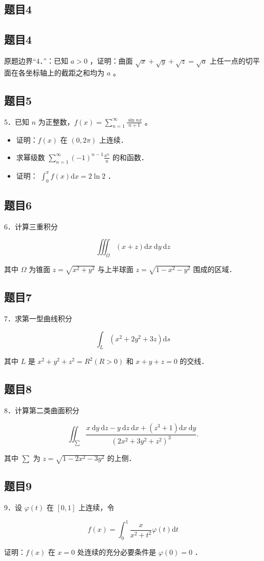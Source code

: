 \documentclass{article}
\begin{document}
\subsection{题目4}

\subsection{题目4}
原题边界“4．”：已知 \(a>0\) ，证明：曲面 \(\sqrt{x}+\sqrt{y}+\sqrt{z}=\sqrt{a}\) 上任一点的切平面在各坐标轴上的截距之和均为 \(a\) 。

\subsection{题目5}
5．已知 \(n\) 为正整数，\(f(x)=\sum_{n=1}^{\infty} \frac{\sin n x}{n+1}\) 。

\begin{itemize}
  \item[（1）] 证明：\(f(x)\) 在 \((0,2 \pi)\) 上连续．
  \item[（2）] 求幂级数 \(\sum_{n=1}^{\infty}(-1)^{n-1} \frac{x^{n}}{n}\) 的和函数．
  \item[（3）] 证明： \(\int_{0}^{\pi} f(x) \mathrm{d} x=2 \ln 2\) ．
\end{itemize}

\subsection{题目6}
6．计算三重积分

\[
\iiint_{\Omega}(x+z) \mathrm{d} x \mathrm{~d} y \mathrm{~d} z
\]

其中 \(\Omega\) 为锥面 \(z=\sqrt{x^{2}+y^{2}}\) 与上半球面 \(z=\sqrt{1-x^{2}-y^{2}}\) 围成的区域．

\subsection{题目7}
7．求第一型曲线积分

\[
\int_{L}\left(x^{2}+2 y^{2}+3 z\right) \mathrm{d} s
\]

其中 \(L\) 是 \(x^{2}+y^{2}+z^{2}=R^{2}(R>0)\) 和 \(x+y+z=0\) 的交线．

\subsection{题目8}
8．计算第二类曲面积分

\[
\iint_{\sum} \frac{x \mathrm{~d} y \mathrm{~d} z-y \mathrm{~d} z \mathrm{~d} x+\left(z^{3}+1\right) \mathrm{d} x \mathrm{~d} y}{\left(2 x^{2}+3 y^{2}+z^{2}\right)^{3}} .
\]

其中 \(\sum\) 为 \(z=\sqrt{1-2 x^{2}-3 y^{2}}\) 的上侧．

\subsection{题目9}
9．设 \(\varphi(t)\) 在 \([0,1]\) 上连续，令

\[
f(x)=\int_{0}^{1} \frac{x}{x^{2}+t^{2}} \varphi(t) \mathrm{d} t
\]

证明：\(f(x)\) 在 \(x=0\) 处连续的充分必要条件是 \(\varphi(0)=0\) ．
\end{document}
